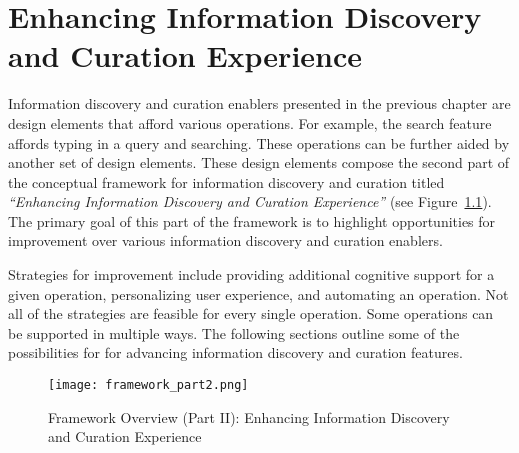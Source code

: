 \chapter{Enhancing Information Discovery and Curation Experience}
\label{chapter:improving}

Information discovery and curation enablers presented in the previous chapter are design elements that afford various operations. For example, the search feature affords typing in a query and searching. These operations can be further aided by another set of design elements. These design elements compose the second part of the conceptual framework for information discovery and curation titled \textit{``Enhancing Information Discovery and Curation Experience''} (see Figure~\ref{fig:framework_part2}). The primary goal of this part of the framework is to highlight opportunities for improvement over various information discovery and curation enablers.

Strategies for improvement include providing additional cognitive support for a given operation, personalizing user experience, and automating an operation. Not all of the strategies are feasible for every single operation. Some operations can be supported in multiple ways. The following sections outline some of the possibilities for for advancing information discovery and curation features. 
 
\begin{figure}[ht!]
	\noindent
	\centering
	\texttt{[image: framework\_part2.png]}
	\caption{Framework Overview (Part II): Enhancing Information Discovery and Curation Experience}
	\label{fig:framework_part2} 
\end{figure}

